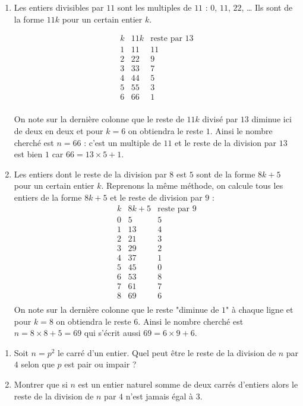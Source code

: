 \documentclass[11pt,class=report,crop=false]{standalone}
\begin{document}
\correction
\sauteligne
\begin{enumerate}
  \item 
Les entiers divisibles par $11$ sont les multiples de $11$ : $0$, $11$, $22$, \ldots{} Ils sont de la forme $11k$ pour un certain entier $k$.

$$\begin{array}{c|c|c}
k & 11 k & \text{reste par $13$} \\ \hline
1  &  11  &  11 \\
2  &  22  &  9 \\
3  &  33  &  7 \\
4  &  44  &  5 \\
5  &  55  &  3 \\
6  &  66  &  1 \\
\end{array}$$

On note sur la dernière colonne que le reste de $11k$ divisé par $13$ diminue ici de deux en deux et pour $k=6$ on obtiendra le reste $1$. Ainsi le nombre cherché est $n=66$ : c'est un multiple de $11$ et le reste de la division par $13$ est bien $1$ car $66 = 13 \times 5 +1$.

  
  \item Les entiers dont le reste de la division par $8$ est $5$ sont de la forme $8k+5$ pour un certain entier $k$. Reprenons la même méthode, on calcule tous les entiers de la forme $8k+5$ et le reste de division par $9$ :
$$\begin{array}{c|c|c}
k & 8 k + 5 & \text{reste par $9$} \\ \hline
0  &  5  &  5 \\
1  &  13  &  4 \\
2  &  21  &  3 \\
3  &  29  &  2 \\
4  &  37  &  1 \\
5  &  45  &  0 \\
6  &  53  &  8 \\
7  &  61  &  7 \\
8  &  69  &  6 \\
\end{array}$$  
 On note sur la dernière colonne que le reste "diminue de $1$" à chaque ligne et pour  $k=8$ on obtiendra le reste $6$. Ainsi le nombre cherché est $n=8\times8+5=69$ qui s'écrit aussi $69=6\times9+6$. 
\end{enumerate}
\fincorrection
\finexercice


\exercice{}
\enonce
\sauteligne
\begin{enumerate}
    \item Soit $n=p^2$ le carré d'un entier. Quel peut être le reste de la division de $n$ par $4$ selon que $p$ est pair ou impair ?
    \item Montrer que si $n$ est un entier naturel somme de deux carrés d'entiers 
    alors le reste de la division de $n$ par $4$ n'est jamais égal à $3$.
\end{enumerate}
\end{document}
